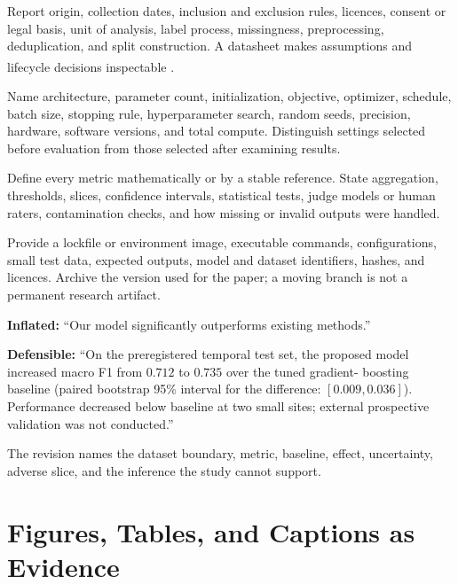 \begin{tcbitemize}[skin=sectionraster]
\tcbitem[title={Data},raster multicolumn=3]
Report origin, collection dates, inclusion and exclusion rules, licences,
consent or legal basis, unit of analysis, label process, missingness,
preprocessing, deduplication, and split construction.
A datasheet makes assumptions and lifecycle decisions inspectable
\textsuperscript{\cite{gebruDatasheetsDatasets2021}}.

\tcbitem[title={Models and Training},raster multicolumn=3]
Name architecture, parameter count, initialization, objective, optimizer,
schedule, batch size, stopping rule, hyperparameter search, random seeds,
precision, hardware, software versions, and total compute.
Distinguish settings selected before evaluation from those selected after
examining results.

\tcbitem[title={Evaluation},raster multicolumn=3]
Define every metric mathematically or by a stable reference.
State aggregation, thresholds, slices, confidence intervals, statistical
tests, judge models or human raters, contamination checks, and how missing or
invalid outputs were handled.

\tcbitem[title={Artifacts and Environment},raster multicolumn=3]
Provide a lockfile or environment image, executable commands, configurations,
small test data, expected outputs, model and dataset identifiers, hashes, and
licences.
Archive the version used for the paper; a moving branch is not a permanent
research artifact.
\end{tcbitemize}

\begin{workedexample}
\textbf{Inflated:} ``Our model significantly outperforms existing methods.''

\textbf{Defensible:} ``On the preregistered temporal test set, the proposed
model increased macro F1 from $0.712$ to $0.735$ over the tuned gradient-
boosting baseline (paired bootstrap 95\% interval for the difference:
$[0.009,0.036]$). Performance decreased below baseline at two small sites;
external prospective validation was not conducted.''

The revision names the dataset boundary, metric, baseline, effect,
uncertainty, adverse slice, and the inference the study cannot support.
\end{workedexample}

\section{Figures, Tables, and Captions as Evidence}

